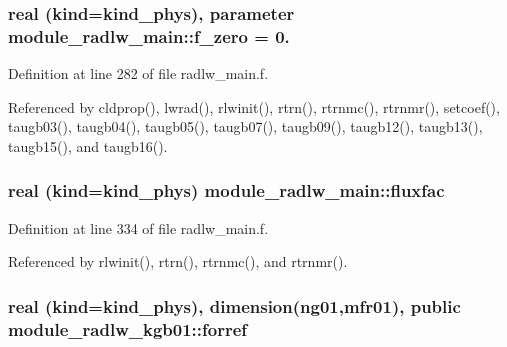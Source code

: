 \subsubsection[{\texorpdfstring{f\+\_\+zero}{f_zero}}]{\setlength{\rightskip}{0pt plus 5cm}real (kind=kind\+\_\+phys), parameter module\+\_\+radlw\+\_\+main\+::f\+\_\+zero = 0.\hspace{0.3cm}{\ttfamily [private]}}\hypertarget{group__module__radlw__main_ga9b8f65236249b31c8f9fcf1cfd0e7baa}{}\label{group__module__radlw__main_ga9b8f65236249b31c8f9fcf1cfd0e7baa}


Definition at line 282 of file radlw\+\_\+main.\+f.



Referenced by cldprop(), lwrad(), rlwinit(), rtrn(), rtrnmc(), rtrnmr(), setcoef(), taugb03(), taugb04(), taugb05(), taugb07(), taugb09(), taugb12(), taugb13(), taugb15(), and taugb16().

\subsubsection[{\texorpdfstring{fluxfac}{fluxfac}}]{\setlength{\rightskip}{0pt plus 5cm}real (kind=kind\+\_\+phys) module\+\_\+radlw\+\_\+main\+::fluxfac\hspace{0.3cm}{\ttfamily [private]}}\hypertarget{group__module__radlw__main_ga3c31da677e01139d9a3f1e0795a0b614}{}\label{group__module__radlw__main_ga3c31da677e01139d9a3f1e0795a0b614}


Definition at line 334 of file radlw\+\_\+main.\+f.



Referenced by rlwinit(), rtrn(), rtrnmc(), and rtrnmr().

\subsubsection[{\texorpdfstring{forref}{forref}}]{\setlength{\rightskip}{0pt plus 5cm}real (kind=kind\+\_\+phys), dimension(ng01,mfr01), public module\+\_\+radlw\+\_\+kgb01\+::forref}\hypertarget{group__module__radlw__main_gacd70a32f88808dc40c39edee5b76adbe}{}\label{group__module__radlw__main_gacd70a32f88808dc40c39edee5b76adbe}



